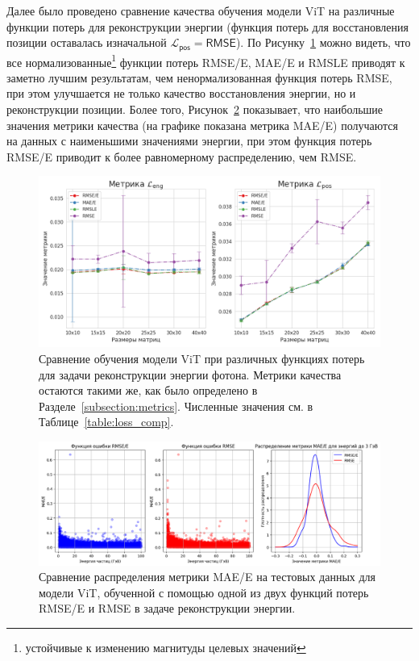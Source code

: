\documentclass[a4paper,12pt]{extarticle}
\begin{document}
Далее было проведено сравнение качества обучения модели \textsf{ViT} на различные функции потерь для реконструкции энергии (функция потерь для восстановления позиции оставалась изначальной $\mathcal{L}_{\textsf{pos}} = \textsf{RMSE}$). По Рисунку~\ref{graph:loss_comp} можно видеть, что все нормализованные\footnote{устойчивые к изменению магнитуды целевых значений} функции потерь \textsf{RMSE/E}, \textsf{MAE/E} и \textsf{RMSLE} приводят к заметно лучшим результатам, чем ненормализованная функция потерь \textsf{RMSE}, при этом улучшается не только качество восстановления энергии, но и реконструкции позиции. Более того, Рисунок~\ref{graph:loss_distr} показывает, что наибольшие значения метрики качества (на графике показана метрика \textsf{MAE/E}) получаются на данных с наименьшими значениями энергии, при этом функция потерь \textsf{RMSE/E} приводит к более равномерному распределению, чем \textsf{RMSE}.

\begin{figure}[t]
    \centering
    \includegraphics[width=1.0\textwidth]{graphics/loss_comp.png}
    \caption{Сравнение обучения модели \textsf{ViT} при различных функциях потерь для задачи реконструкции энергии фотона. Метрики качества остаются такими же, как было определено в Разделе~\ref{subsection:metrics}. Численные значения см. в Таблице~\ref{table:loss_comp}.}
    \label{graph:loss_comp}
\end{figure}

\begin{figure}[t]
    \centering
    \includegraphics[width=1.0\textwidth]{graphics/exp2_distr_comp.png}
    \caption{Сравнение распределения метрики \textsf{MAE/E} на тестовых данных для модели \textsf{ViT}, обученной с помощью одной из двух функций потерь \textsf{RMSE/E} и \textsf{RMSE} в задаче реконструкции энергии.}
    \label{graph:loss_distr}
\end{figure}
\end{document}
